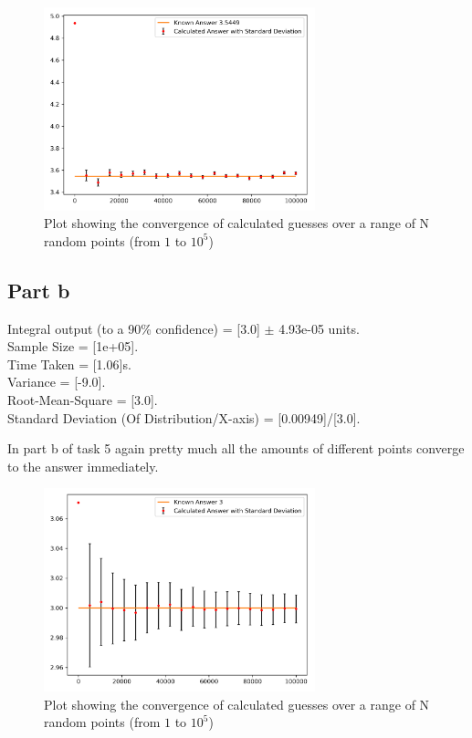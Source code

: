 \documentclass[12pt, A4]{article}
\begin{document}
\begin{figure}[H]
  \begin{center}
    \includegraphics[width=0.7\textwidth]{task_5_a.png}
  \end{center}
  \caption{Plot showing the convergence of calculated guesses over a range of N random points (from $1$ to $10^5$)}
  \label{fig:task_5_a}
\end{figure}


\subsection{Part b} %
\label{sub:task5Part b}

Integral output (to a 90\% confidence) = [3.0] $\pm$  4.93e-05 units.
\\
Sample Size = [1e+05].
\\
Time Taken = [1.06]s.
\\
Variance = [-9.0].
\\
Root-Mean-Square = [3.0].
\\
Standard Deviation (Of Distribution/X-axis) = [0.00949]/[3.0]. 


\vspace{1em}

In part b of task 5 again pretty much all the amounts of different points converge 
to the answer immediately.

\begin{figure}[H]
  \begin{center}
    \includegraphics[width=0.7\textwidth]{task_5_b.png}
  \end{center}
  \caption{Plot showing the convergence of calculated guesses over a range of N random points (from $1$ to $10^5$)}
  \label{fig:task_5_b}
\end{figure}
\end{document}
